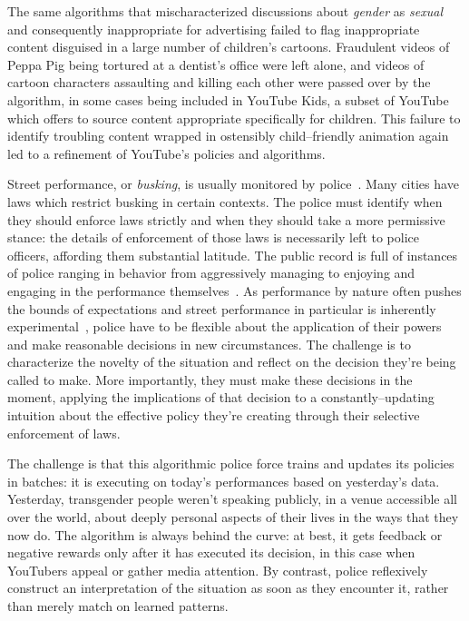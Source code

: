 \documentclass[street-level_algorithms]{subfiles}
\begin{document}
The same algorithms that mischaracterized discussions about
\textit{gender} as \textit{sexual} and consequently inappropriate for advertising
failed to flag
inappropriate content disguised in a large number of children's cartoons.
Fraudulent videos of Peppa Pig being tortured at a dentist's office were left alone, and
videos of cartoon characters assaulting and killing each other were passed over by the algorithm,
in some cases being included in YouTube Kids,
a subset of YouTube which offers to source content appropriate specifically for children.
This failure to identify troubling content wrapped in
ostensibly child--friendly animation
again led to a refinement of YouTube's policies and algorithms.

Street performance, or \textit{busking}, is usually monitored by police~\cite{quilter2015long}.
Many cities have laws which restrict busking in certain contexts.
The police must identify when they should enforce laws strictly and when they should take a more permissive stance:
the details of enforcement of those laws is necessarily left to police officers,
affording them substantial latitude.
The public record is full of instances of police ranging in behavior from
aggressively managing to enjoying and engaging in the performance themselves~\cite{grill2011street}.
As performance by nature often pushes the bounds of expectations and
street performance in particular is inherently experimental~\cite{harrison1990drawing},
police have to be flexible about the application of their powers and make reasonable decisions in new circumstances.
The challenge is to characterize the novelty of the situation and reflect on the decision they're being called to make.
More importantly, they must make these decisions in the moment,
applying the implications of that decision to a constantly--updating intuition about
the effective policy they're creating through their selective enforcement of laws.

The challenge is that this algorithmic police force trains and updates its policies in batches:
it is executing on today's performances based on yesterday's data.
Yesterday, transgender people weren't speaking publicly,
in a venue accessible all over the world,
about deeply personal aspects of their lives in the ways that they now do.
The algorithm is always behind the curve:
at best, it gets feedback or negative rewards
only after it has executed its decision,
in this case when YouTubers appeal or gather media attention.
By contrast, police reflexively construct
an interpretation of the situation as soon as they encounter it,
rather than merely match on learned patterns.
\end{document}
